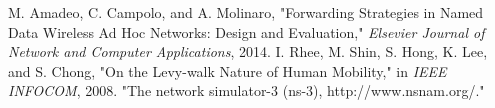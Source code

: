 \documentclass[conference]{IEEEtran}
\begin{document}
\begin{thebibliography}{00}
 M. Amadeo, C. Campolo, and A. Molinaro, "Forwarding Strategies in Named Data Wireless Ad Hoc Networks: Design and Evaluation," \textit{Elsevier Journal of Network and Computer Applications}, 2014.
 I. Rhee, M. Shin, S. Hong, K. Lee, and S. Chong, "On the Levy-walk Nature of Human Mobility," in \textit{IEEE INFOCOM}, 2008.
 "The network simulator-3 (ns-3), http://www.nsnam.org/."
\end{thebibliography}
\vspace{12pt}
\color{red}
\end{document}
